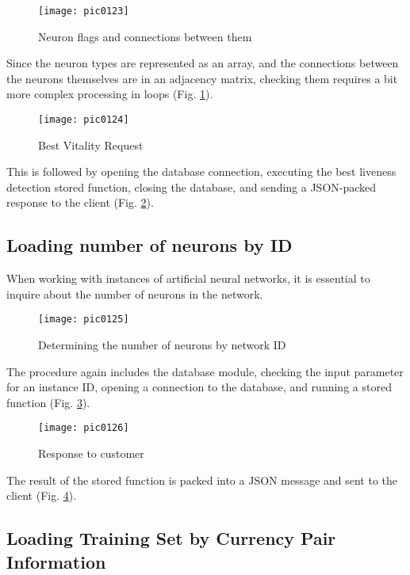 \begin{figure}[h]
\centering
\texttt{[image: pic0123]}
\caption{Neuron flags and connections between them}
\label{fig:pic0123}
\end{figure}
\FloatBarrier

Since the neuron types are represented as an array, and the connections between the neurons themselves are in an adjacency matrix, checking them requires a bit more complex processing in loops (Fig. \ref{fig:pic0123}).

\begin{figure}[h]
\centering
\texttt{[image: pic0124]}
\caption{Best Vitality Request}
\label{fig:pic0124}
\end{figure}
\FloatBarrier

This is followed by opening the database connection, executing the best liveness detection stored function, closing the database, and sending a JSON-packed response to the client (Fig. \ref{fig:pic0124}).

\subsection{Loading number of neurons by ID}

When working with instances of artificial neural networks, it is essential to inquire about the number of neurons in the network.

\begin{figure}[h]
\centering
\texttt{[image: pic0125]}
\caption{Determining the number of neurons by network ID}
\label{fig:pic0125}
\end{figure}
\FloatBarrier

The procedure again includes the database module, checking the input parameter for an instance ID, opening a connection to the database, and running a stored function (Fig. \ref{fig:pic0125}).

\begin{figure}[h]
\centering
\texttt{[image: pic0126]}
\caption{Response to customer}
\label{fig:pic0126}
\end{figure}
\FloatBarrier

The result of the stored function is packed into a JSON message and sent to the client (Fig. \ref{fig:pic0126}).

\subsection{Loading Training Set by Currency Pair Information}

